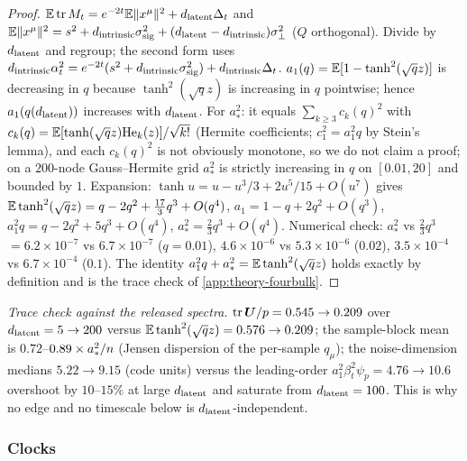 \begin{proof}
$\mathbb{E}\operatorname{tr}M_t=e^{-2t}\mathbb{E}\|x^\mu\|^2+d_{\mathrm{latent}}\Delta_t$ and $\mathbb{E}\|x^\mu\|^2=s^2+d_{\mathrm{intrinsic}}\sigma_{\mathrm{sig}}^2+(d_{\mathrm{latent}}-d_{\mathrm{intrinsic}})\sigma_{\perp}^2$ ($Q$ orthogonal). Divide by $d_{\mathrm{latent}}$ and regroup; the second form uses $d_{\mathrm{intrinsic}}\alpha_t^2=e^{-2t}(s^2+d_{\mathrm{intrinsic}}\sigma_{\mathrm{sig}}^2)+d_{\mathrm{intrinsic}}\Delta_t$. $a_1(q)=\mathbb{E}[1-\tanh^2(\sqrt qz)]$ is decreasing in $q$ because $\tanh^2(\sqrt q z)$ is increasing in $q$ pointwise; hence $a_1(q(d_{\mathrm{latent}}))$ increases with $d_{\mathrm{latent}}$. For $a_*^2$: it equals $\sum_{k\ge3}c_k(q)^2$ with $c_k(q)=\mathbb{E}[\tanh(\sqrt qz)\mathrm{He}_k(z)]/\sqrt{k!}$ (Hermite coefficients; $c_1^2=a_1^2q$ by Stein's lemma), and each $c_k(q)^2$ is not obviously monotone, so we do not claim a proof; on a $200$-node Gauss--Hermite grid $a_*^2$ is strictly increasing in $q$ on $[0.01,20]$ and bounded by $1$. Expansion: $\tanh u=u-u^3/3+2u^5/15+O(u^7)$ gives $\mathbb{E}\tanh^2(\sqrt qz)=q-2q^2+\tfrac{17}3q^3+O(q^4)$, $a_1=1-q+2q^2+O(q^3)$, $a_1^2q=q-2q^2+5q^3+O(q^4)$, $a_*^2=\tfrac23q^3+O(q^4)$. Numerical check: $a_*^2$ vs $\tfrac23q^3$ $=6.2\times10^{-7}$ vs $6.7\times10^{-7}$ ($q=0.01$), $4.6\times10^{-6}$ vs $5.3\times10^{-6}$ ($0.02$), $3.5\times10^{-4}$ vs $6.7\times10^{-4}$ ($0.1$). The identity $a_1^2q+a_*^2=\mathbb{E}\tanh^2(\sqrt qz)$ holds exactly by definition and is the trace check of \cref{app:theory-fourbulk}.
\end{proof}

\noindent\emph{Trace check against the released spectra.} $\operatorname{tr}\bm{U}/p=0.545\to0.209$ over $d_{\mathrm{latent}}=5\to200$ versus $\mathbb{E}\tanh^2(\sqrt qz)=0.576\to0.209$; the sample-block mean is $0.72$--$0.89\times a_*^2/n$ (Jensen dispersion of the per-sample $q_\mu$); the noise-dimension medians $5.22\to9.15$ (code units) versus the leading-order $a_1^2\beta_t^2\psi_p=4.76\to10.6$ overshoot by $10$--$15\%$ at large $d_{\mathrm{latent}}$ and saturate from $d_{\mathrm{latent}}=100$. This is why no edge and no timescale below is $d_{\mathrm{latent}}$-independent.

\subsubsection{Clocks}


